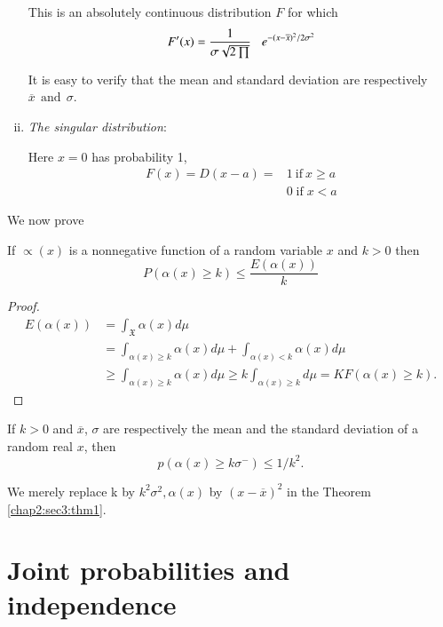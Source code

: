 \begin{enumerate}[(i)]
  This is an absolutely continuous distribution $F$ for which 
  $$
  F'(x) =\frac{1}{\sigma \sqrt{2\prod}} \hspace{0.3cm}   e^{-(x
    -\overline{x})^2 /2 \sigma^2}
  $$
  
  It is easy to verify that the mean and standard deviation are
  respectively $\overline{x} ~~\text{and} ~~\sigma$.
  
\item \textit{The singular distribution}:
 
  Here $x = 0$ has  probability 1,
  \begin {align*}
    F(x)  = D (x - a)  = & 1 ~\text{if}~ x \geq a \\
    & 0  \; \text {if}  \; x < a
  \end{align*}
\end{enumerate}

We now prove
\setcounter{theorem}{0} 
\begin{theorem}\label{chap2:sec3:thm1} %
  If $\propto (x)$ is a nonnegative function of a random variable $x$
  and $k > 0$ then 
  $$
  P(\alpha (x) \geq k) \leq \frac{E(\alpha(x))}{k}
  $$
\end{theorem}

\begin{proof}
  \begin{align*}
    E(\alpha (x)) & = \int_{\mathfrak{X}}\alpha (x)d \mu\\
    &= \int_{\alpha (x) \geq k}\alpha (x)d \mu + \int_{\alpha (x) < k}
    \alpha (x) d \mu\\ 
    & \ge \int_{\alpha(x)\ge k} \alpha(x)d\mu \ge k \int_{\alpha(x)\ge 
      k}d\mu=KF (\alpha(x)\ge k).  
  \end{align*}
\end{proof}\pageoriginale

\begin{coro*}
  If $k>0$ and $\overline{x}$, $\sigma$ are respectively the mean and the
  standard deviation of a random real $x$, then
  $$
  p(\alpha(x)\ge k \sigma^{-})\le 1/k^2.
  $$
\end{coro*}

We merely replace k by $k^2 \sigma^2,\alpha(x)$ by
$(x-\overline{x})^2$ in the Theorem \ref{chap2:sec3:thm1}. 

\section{Joint probabilities and independence}\label{chap2:sec4}


